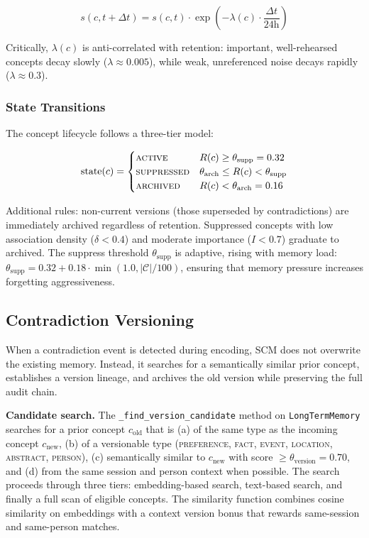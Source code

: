 \documentclass[11pt,twocolumn]{article}
\begin{document}
\begin{equation}
s(c, t + \Delta t) = s(c, t) \cdot \exp\left(-\lambda(c) \cdot \frac{\Delta t}{24\text{h}}\right)
\label{eq:strength_decay}
\end{equation}

Critically, $\lambda(c)$ is anti-correlated with retention: important, well-rehearsed concepts decay slowly ($\lambda \approx 0.005$), while weak, unreferenced noise decays rapidly ($\lambda \approx 0.3$).

\subsubsection{State Transitions}

The concept lifecycle follows a three-tier model:

\begin{equation}
\text{state}(c) = \begin{cases}
\text{\scshape active}     & R(c) \geq \theta_{\text{supp}} = 0.32 \\
\text{\scshape suppressed} & \theta_{\text{arch}} \leq R(c) < \theta_{\text{supp}} \\
\text{\scshape archived}   & R(c) < \theta_{\text{arch}} = 0.16
\end{cases}
\label{eq:state_transitions}
\end{equation}

Additional rules: non-current versions (those superseded by contradictions) are immediately archived regardless of retention. Suppressed concepts with low association density ($\delta < 0.4$) and moderate importance ($I < 0.7$) graduate to archived. The suppress threshold $\theta_{\text{supp}}$ is adaptive, rising with memory load: $\theta_{\text{supp}} = 0.32 + 0.18 \cdot \min(1.0, |\mathcal{C}| / 100)$, ensuring that memory pressure increases forgetting aggressiveness.

\subsection{Contradiction Versioning}
\label{sec:versioning}

When a contradiction event is detected during encoding, SCM does not overwrite the existing memory. Instead, it searches for a semantically similar prior concept, establishes a version lineage, and archives the old version while preserving the full audit chain.

\textbf{Candidate search.} The \texttt{\_find\_version\_candidate} method on \texttt{LongTermMemory} searches for a prior concept $c_{\text{old}}$ that is (a) of the same type as the incoming concept $c_{\text{new}}$, (b) of a versionable type (\textsc{preference}, \textsc{fact}, \textsc{event}, \textsc{location}, \textsc{abstract}, \textsc{person}), (c) semantically similar to $c_{\text{new}}$ with score $\geq \theta_{\text{version}} = 0.70$, and (d) from the same session and person context when possible. The search proceeds through three tiers: embedding-based search, text-based search, and finally a full scan of eligible concepts. The similarity function combines cosine similarity on embeddings with a context version bonus that rewards same-session and same-person matches.
\end{document}
